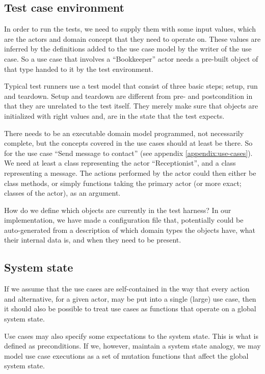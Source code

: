 \subsection{Test case environment}
\label{sec:test_case_state}
In order to run the tests, we need to supply them with some input values, which are the actors and domain concept that they need to operate on. These values are inferred by the definitions added to the use case model by the writer of the use case. So a use case that involves a ``Bookkeeper'' actor needs a pre-built object of that type handed to it by the test environment.\bigskip

\noindent Typical test runners use a test model that consist of three basic steps; setup, run and teardown. Setup and teardown are different from pre- and postcondition in that they are unrelated to the test itself. They merely make sure that objects are initialized with right values and, are in the state that the test expects.

There needs to be an executable domain model programmed, not necessarily complete, but the concepts covered in the use cases should at least be there. So for the use case ``Send message to contact'' (see appendix \ref{appendix:use-cases}). We need at least a class representing the actor ``Receptionist'', and a class representing a message. The actions performed by the actor could then either be class methods, or simply functions taking the primary actor (or more exact; classes of the actor), as an argument.

How do we define which objects are currently in the test harness? In our implementation, we have made a configuration file that, potentially could be auto-generated from a description of which domain types the objects have, what their internal data is, and when they need to be present.

\subsection{System state}
\label{ssec:system-state}
If we assume that the use cases are self-contained\cite{larman2005} in the way that every action and alternative, for a given actor, may be put into a single (large) use case, then it should also be possible to treat use cases as functions that operate on a global system state.\bigskip

\noindent Use cases may also specify some expectations to the system state. This is what is defined as preconditions. If we, however, maintain a system state analogy, we may model use case executions as a set of mutation functions that affect the global system state.\bigskip

